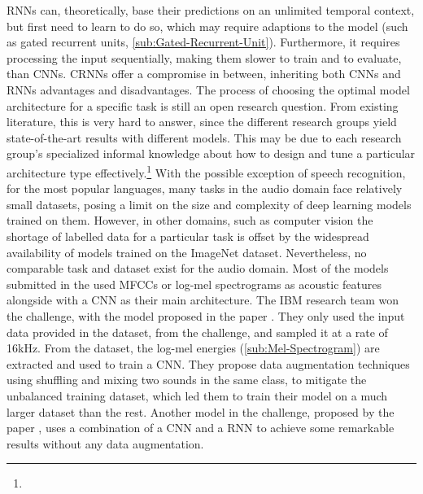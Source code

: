 \newline
\newline
\glspl{RNN} can, theoretically, base their predictions on an unlimited temporal context, but first need to learn to do so, which may require adaptions to the model (such as gated recurrent units, \ref{sub:Gated-Recurrent-Unit}). Furthermore, it requires processing the input sequentially, making them slower to train and to evaluate, than \glspl{CNN}. \Glspl{CRNN} offer a compromise in between, inheriting both \glspl{CNN} and \glspl{RNN} advantages and disadvantages.
\newline
\newline
The process of choosing the optimal model architecture for a specific task is still an open research question. From existing literature, this is very hard to answer, since the different research groups yield state-of-the-art results with different models. This may be due to each research group’s specialized informal knowledge about how to design and tune a particular architecture type effectively.\footnote{}
\newline
\newline
With the possible exception of speech recognition, for the most popular languages, many tasks in the audio domain face relatively small datasets, posing a limit on the size and complexity of deep learning models trained on them. However, in other domains, such as computer vision the shortage of labelled data for a particular task is offset by the widespread availability of models trained on the ImageNet dataset. Nevertheless, no comparable task and dataset exist for the audio domain.
\newline
\newline
Most of the models submitted in the  used \glspl{MFCC} or log-mel spectrograms as acoustic features alongside with a \gls{CNN} as their main architecture. The IBM research team won the challenge, with the model proposed in the paper \cite{inoue_domestic_2018}. They only used the input data provided in the dataset, from the challenge, and sampled it at a rate of 16kHz. From the dataset, the log-mel energies (\ref{sub:Mel-Spectrogram}) are extracted and used to train a \gls{CNN}. They propose data augmentation techniques using shuffling and mixing two sounds in the same class, to mitigate the unbalanced training dataset, which led them to train their model on a much larger dataset than the rest.
\newline
\newline
Another model in the challenge, proposed by the paper \cite{liu_ensemble_2018}, uses a combination of a \gls{CNN} and a \gls{RNN} to achieve some remarkable results without any data augmentation. 

